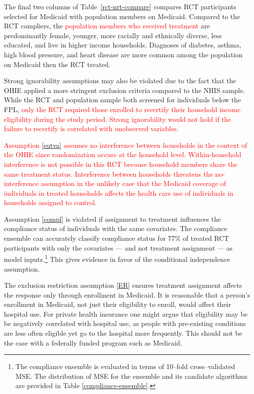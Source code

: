 \documentclass[hidelinks,12pt]{article}
\begin{document}
The final two columns of Table~\ref{rct-nrt-compare} compares RCT participants selected for Medicaid with population members on Medicaid. Compared to the RCT compliers, the \textcolor{red}{population members who received treatment} are predominantly female, younger, more racially and ethnically diverse, less educated, and live in higher income households. Diagnoses of diabetes, asthma, high blood pressure, and heart disease are more common among the population on Medicaid then the RCT treated.

Strong ignorability assumptions may also be violated due to the fact that the OHIE applied a more stringent exclusion criteria compared to the NHIS sample. While the RCT and population sample both screened for individuals below the FPL,  \textcolor{red}{only the RCT required those enrolled to recertify their household income eligibility during the study period. Strong ignorability would not hold if the failure to recertify is correlated with unobserved variables.} 

\textcolor{red}{Assumption \ref{sutva} assumes no interference between households in the context of the OHIE since randomization occurs at the household level. Within-household interference is not possible in this RCT because household members share the same treatment status. Interference between households threatens the no-interference assumption in the unlikely case that the Medicaid coverage of individuals in treated households affects the health care use of individuals in households assigned to control.} 

Assumption \eqref{compl} is violated if assignment to treatment influences the compliance status of individuals with the same covariates. The compliance ensemble can accurately classify compliance status for 77\% of treated RCT participants with only the covariates --- and not treatment assignment --- as model inputs.\footnote{The compliance ensemble is evaluated in terms of 10--fold cross--validated MSE. The distribution of MSE for the ensemble and its candidate algorithms are provided in Table \ref{compliance-ensemble}.}  This gives evidence in favor of the conditional independence assumption.

The exclusion restriction assumption \eqref{ER} ensures treatment assignment affects the response only through enrollment in Medicaid. It is reasonable that a person's enrollment in Medicaid, not just their eligibility to enroll, would affect their hospital use. For private health insurance one might argue that eligibility may be be negatively correlated with hospital use, as people with pre-existing conditions are less often eligible yet go to the hospital more frequently. This should not be the case with a federally funded program such as Medicaid. 
\end{document}
